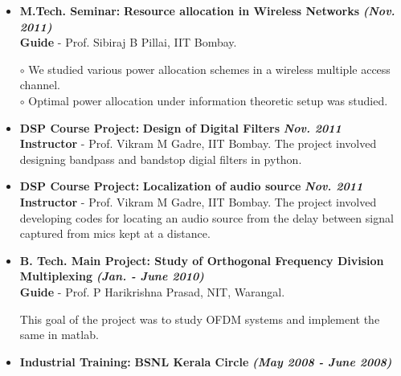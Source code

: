 \documentclass[a4paper,10pt]{article}
\begin{document}
\begin{itemize}
 \item \textbf{M.Tech. Seminar:} \textbf{Resource allocation in Wireless Networks}  \textbf \emph{(Nov. 2011)}\\
        {\textbf{Guide} - Prof. Sibiraj B Pillai, IIT Bombay.   }          %

      $\circ$ We studied various power allocation schemes in a wireless multiple access channel. \\
      $\circ$ Optimal power allocation under information theoretic setup was studied.
       
 \item \textbf{DSP Course Project:} \textbf{Design of Digital Filters} \textbf \emph{Nov. 2011}\\
	{\textbf{Instructor} - Prof. Vikram M Gadre, IIT Bombay. }
	The project involved designing bandpass and bandstop digial filters in python.
	
 \item \textbf{DSP Course Project:} \textbf{Localization of audio source} \textbf \emph{Nov. 2011}\\
	{\textbf{Instructor} - Prof. Vikram M Gadre, IIT Bombay. }
	The project involved developing codes for locating an audio source from the delay between signal captured from 
	mics kept at a distance.

% 



  \item \textbf{{B. Tech. Main Project}: Study of Orthogonal Frequency Division Multiplexing}  \textbf \emph{(Jan. - June 2010)}\\
        {\textbf{Guide} - Prof. P Harikrishna Prasad, NIT, Warangal. }

This goal of the project was to study OFDM systems and implement the same in matlab.

  \item \textbf{Industrial Training:} \textbf{BSNL Kerala Circle}  \textbf \emph{(May 2008 - June 2008)}        


\end{itemize}
\end{document}
